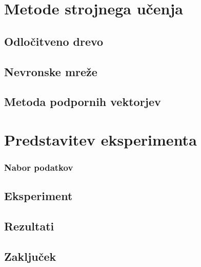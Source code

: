 \documentclass[a4paper,11pt]{article}
\begin{document}
\begin{multicols}{2}
\section{Metode strojnega učenja}

\subsection{Odločitveno drevo}


\subsection{Nevronske mreže}


\subsection{Metoda podpornih vektorjev}



\section{Predstavitev eksperimenta}

\subsubsection{Nabor podatkov}


\subsection{Eksperiment}


\subsection{Rezultati}


\subsection{Zaključek}


\end{multicols}

\normalsize
\newpage

\begin{multicols}{2}


{}


\end{multicols}
\end{document}
